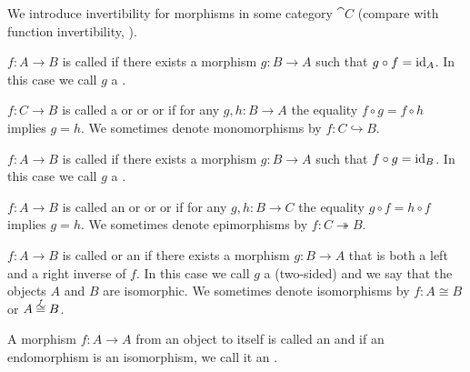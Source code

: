 \begin{definition}\label{def:morphism_invertibility}
  We introduce invertibility for morphisms in some category \( \cat{C} \) (compare with function invertibility, ).

  \begin{thmenum}
     \( f: A \to B \) is called  if there exists a morphism \( g: B \to A \) such that \( g \circ f = \operatorname{id}_A \). In this case we call \( g \) a .

     \( f: C \to B \) is called a  or  or  or  if for any \( g, h: B \to A \) the equality \( f \circ g = f \circ h \) implies \( g = h \). We sometimes denote monomorphisms by \( f: C \hookrightarrow B \).

     \( f: A \to B \) is called  if there exists a morphism \( g: B \to A \) such that \( f \circ g = \operatorname{id}_B \). In this case we call \( g \) a .

     \( f: A \to B \) is called an  or  or  or  if for any \( g, h: B \to C \) the equality \( g \circ f = h \circ f \) implies \( g = h \). We sometimes denote epimorphisms by \( f: C \twoheadrightarrow B \).

     \( f: A \to B \) is called  or an  if there exists a morphism \( g: B \to A \) that is both a left and a right inverse of \( f \). In this case we call \( g \) a (two-sided)  and we say that the objects \( A \) and \( B \) are isomorphic. We sometimes denote isomorphisms by \( f: A \cong B \) or \( A \reloset f \cong B \).

     A morphism \( f: A \to A \) from an object to itself is called an  and if an endomorphism is an isomorphism, we call it an .
  \end{thmenum}
\end{definition}

